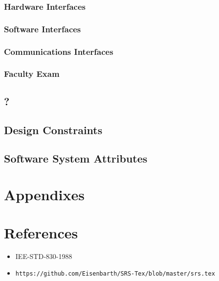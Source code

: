 \documentclass{scrreprt}
\begin{document}
\subsection{Hardware Interfaces}



\subsection{Software Interfaces}



\subsection{Communications Interfaces}




\subsection{Faculty Exam}


\section{?}

\section{Design Constraints}


\section{Software System Attributes}


\chapter{Appendixes}

\chapter{References}

\begin{itemize}
  \item IEE-STD-830-1988
  \item \nolinkurl{https://github.com/Eisenbarth/SRS-Tex/blob/master/srs.tex}
\end{itemize}


\printindex
\end{document}
